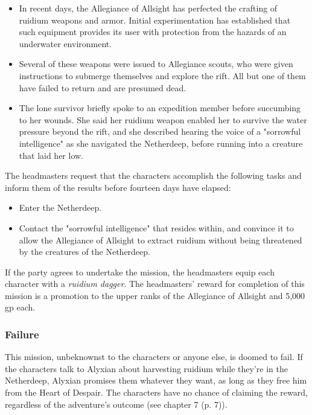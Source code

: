 \documentclass[a4paper, 11pt, bg=full, twocolumn, nooutline]{dndbook}
\begin{document}
\begin{itemize}
\item In recent days, the Allegiance of Allsight has perfected the crafting of ruidium weapons and armor. Initial experimentation has established that such equipment provides its user with protection from the hazards of an underwater environment.
\item Several of these weapons were issued to Allegiance scouts, who were given instructions to submerge themselves and explore the rift. All but one of them have failed to return and are presumed dead.
\item The lone survivor briefly spoke to an expedition member before succumbing to her wounds. She said her ruidium weapon enabled her to survive the water pressure beyond the rift, and she described hearing the voice of a "sorrowful intelligence" as she navigated the Netherdeep, before running into a creature that laid her low.
\end{itemize}

The headmasters request that the characters accomplish the following tasks and inform them of the results before fourteen days have elapsed:

\begin{itemize}
\item Enter the Netherdeep.
\item Contact the "sorrowful intelligence" that resides within, and convince it to allow the Allegiance of Allsight to extract ruidium without being threatened by the creatures of the Netherdeep.
\end{itemize}

If the party agrees to undertake the mission, the headmasters equip each character with a \textit{ruidium dagger}. The headmasters' reward for completion of this mission is a promotion to the upper ranks of the Allegiance of Allsight and 5,000 gp each.

\subsubsection{Failure}

This mission, unbeknownst to the characters or anyone else, is doomed to fail. If the characters talk to Alyxian about harvesting ruidium while they're in the Netherdeep, Alyxian promises them whatever they want, as long as they free him from the Heart of Despair. The characters have no chance of claiming the reward, regardless of the adventure's outcome (see chapter 7 (p. 7)).
\end{document}

